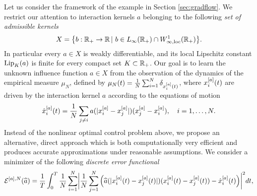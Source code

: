 Let us consider the framework of the example in Section \ref{sec:gradflow}. We restrict our attention to interaction kernels $a$ belonging to the following \textit{set of admissible kernels}
\begin{align*}
	X=\bigl\{b:\mathbb{R}_+\rightarrow\mathbb{R}\,|\ b \in L_{\infty}(\mathbb{R}_+) \cap W^{1}_{\infty,\textup{loc}}(\mathbb{R}_+) \bigr \}.
\end{align*}
In particular every $a \in X$ is weakly differentiable, and its local Lipschitz constant $\textup{Lip}_{K}(a)$ is finite for every compact set $K \subset \mathbb{R}_+$.
Our goal is to learn the unknown influence function $a \in X$ from the observation of the dynamics of the empirical measure $\mu_N$, defined by $\mu_N(t)=\frac{1}{N} \sum_{i=1}^N \delta_{x^{[a]}_i(t)}$, where $x^{[a]}_i(t)$ are driven by the interaction kernel $a$ according to the equations of motion
\begin{equation}\label{fdgradientflow2}
\dot{x}^{[a]}_i(t) = \frac{1}{N} \sum_{j \neq i} a(| x^{[a]}_i -  x^{[a]}_j |) (x^{[a]}_j - x^{[a]}_i), \quad i=1,\dots,N.
\end{equation}
Instead of the nonlinear optimal control problem above, we propose an alternative, direct approach which is both computationally very efficient and produces accurate approximations under reasonable assumptions.
We consider a minimizer of the following \textit{discrete error functional}
\begin{align}\label{eq-def-error1}
	\begin{split}
	\mathcal E^{[a],N}(\widehat a) = \frac{1}{T}\int_0^T\frac{1}{N}\sum_{i=1}^N\biggl|\frac{1}{N}\sum_{j=1}^N
			\left(\widehat a(|x^{[a]}_i(t)-x^{[a]}_j(t)|)(x^{[a]}_i(t) - x^{[a]}_j(t))-\dot{x}^{[a]}_i(t)\right)\biggr|^2 dt,
	\end{split}
\end{align}
